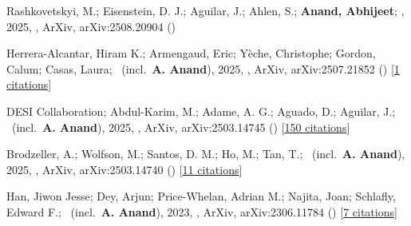 \item[{\color{numcolor}\scriptsize5}] Rashkovetskyi, M.; Eisenstein, D. J.; Aguilar, J.; Ahlen, S.; \textbf{Anand, Abhijeet}; \etal, 2025, , ArXiv, arXiv:2508.20904 ()

\item[{\color{numcolor}\scriptsize4}] Herrera-Alcantar, Hiram K.; Armengaud, Eric; Y{\`e}che, Christophe; Gordon, Calum; Casas, Laura; \etal\ (incl.\ \textbf{A. Anand}), 2025, , ArXiv, arXiv:2507.21852 () [\href{https://ui.adsabs.harvard.edu/abs/2025arXiv250721852H}{1 citations}]

\item[{\color{numcolor}\scriptsize3}] DESI Collaboration; Abdul-Karim, M.; Adame, A. G.; Aguado, D.; Aguilar, J.; \etal\ (incl.\ \textbf{A. Anand}), 2025, , ArXiv, arXiv:2503.14745 () [\href{https://ui.adsabs.harvard.edu/abs/2025arXiv250314745D}{150 citations}]

\item[{\color{numcolor}\scriptsize2}] Brodzeller, A.; Wolfson, M.; Santos, D. M.; Ho, M.; Tan, T.; \etal\ (incl.\ \textbf{A. Anand}), 2025, , ArXiv, arXiv:2503.14740 () [\href{https://ui.adsabs.harvard.edu/abs/2025arXiv250314740B}{11 citations}]

\item[{\color{numcolor}\scriptsize1}] Han, Jiwon Jesse; Dey, Arjun; Price-Whelan, Adrian M.; Najita, Joan; Schlafly, Edward F.; \etal\ (incl.\ \textbf{A. Anand}), 2023, , ArXiv, arXiv:2306.11784 () [\href{https://ui.adsabs.harvard.edu/abs/2023arXiv230611784H}{7 citations}]